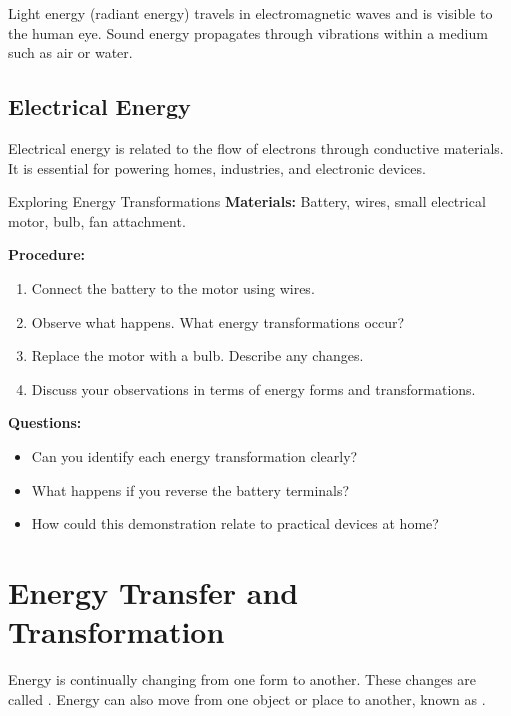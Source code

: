 Light energy (radiant energy) travels in electromagnetic waves and is visible to the human eye. Sound energy propagates through vibrations within a medium such as air or water.


\subsection{Electrical Energy}

Electrical energy is related to the flow of electrons through conductive materials. It is essential for powering homes, industries, and electronic devices.

\begin{investigation}{Exploring Energy Transformations}
\textbf{Materials:} Battery, wires, small electrical motor, bulb, fan attachment.

\textbf{Procedure:}
\begin{enumerate}
\item Connect the battery to the motor using wires.
\item Observe what happens. What energy transformations occur?
\item Replace the motor with a bulb. Describe any changes.
\item Discuss your observations in terms of energy forms and transformations.
\end{enumerate}

\textbf{Questions:}
\begin{itemize}
\item Can you identify each energy transformation clearly?
\item What happens if you reverse the battery terminals?
\item How could this demonstration relate to practical devices at home?
\end{itemize}
\end{investigation}

\section{Energy Transfer and Transformation}

Energy is continually changing from one form to another. These changes are called . Energy can also move from one object or place to another, known as .


